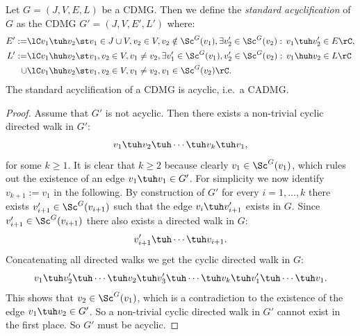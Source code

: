 \begin{Eg}
    Let $G=(J,V,E,L)$ be a CDMG. Then we define the \emph{standard acyclification} of $G$ as the CDMG
    $ G'=(J,V,E',L')$ 
    where:
      \begin{align*} 
          E' := & \lC v_1 \tuh v_2  \st v_1 \in J \cup V, v_2 \in V, v_2 \notin \Sc^G(v_1),\exists v_2' \in \Sc^G(v_2):\, 
   v_1 \tuh v_2' \in E\rC,\\
          L' := &\lC v_1 \huh v_2  \st v_1,v_2 \in V, v_1 \neq v_2, \exists v_1' \in \Sc^G(v_1), v_2' \in \Sc^G(v_2):\, v_1 \huh v_2 \in L \rC \\ \cup &
\lC v_1 \huh v_2  \st v_1,v_2 \in V, v_1 \neq v_2, v_1 \in \Sc^G(v_2) \rC.
\end{align*}
The standard acyclification of a CDMG is acyclic, i.e.\ a CADMG.
\begin{proof}
    Assume that $G'$ is not acyclic. Then there exists a non-trivial cyclic directed walk in $G'$:
    \[ v_1 \tuh v_2 \tuh \cdots \tuh v_k \tuh v_1, \]
    for some $k \ge 1$. It is clear that $k \ge 2$ because clearly $v_1 \in \Sc^G(v_1)$, which rules out the existence of an edge $v_1 \tuh v_1 \in G'$. 
    For simplicity we now identify $v_{k+1} := v_1$ in the following.
    By construction of $G'$ for every $i=1,\dots,k$ there exists $v'_{i+1} \in \Sc^G(v_{i+1})$ 
    such that the edge $v_i \tuh v_{i+1}'$ exists in $G$. Since $v'_{i+1} \in \Sc^G(v_{i+1})$ there also exists a directed walk in $G$: 
     \[v'_{i+1} \tuh \cdots \tuh v_{i+1}.\]
     Concatenating all directed walks we get the cyclic directed walk in $G$:
    \[ v_1 \tuh v_2' \tuh \cdots \tuh v_2 \tuh v_3' \tuh \cdots \tuh v_k 
    \tuh v_1' \tuh \cdots \tuh v_1. \]
    This shows that $v_2 \in \Sc^G(v_1)$, which is a contradiction to the existence of the edge $v_1 \tuh v_2 \in G'$.
    So a non-trivial cyclic directed walk in $G'$ cannot exist in the first place. So $G'$ must be acyclic.
\end{proof}
\end{Eg}

